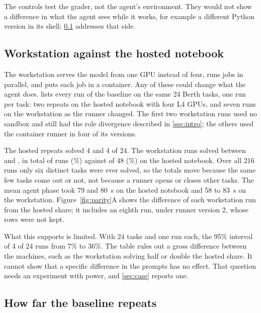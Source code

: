 The controls test the grader, not the agent's environment. They would not show a difference in what the agent sees
while it works, for example a different Python version in its shell; \cref{sec:parity} addresses that side.

\subsection{Workstation against the hosted notebook}\label{sec:parity}



The workstation serves the model from one GPU instead of four, runs jobs in parallel, and puts each job in a
container. Any of these could change what the agent does.  lists every run of the baseline on the
same 24 Berth tasks, one run per task: two repeats on the hosted notebook with four L4 GPUs, and seven runs on the
workstation as the runner changed. The first two workstation runs used no sandbox and still had the role divergence
described in \cref{sec:intro}; the others used the container runner in four of its versions.

The hosted repeats solved 4 and 4 of 24. The workstation runs solved between \ParityMin{} and \ParityMax{}, in total
\ParityWsTotal{} of \ParityWsRuns{} runs (\ParityWsPct\%) against \ParityHostedTotal{} of 48 (\ParityHostedPct\%) on
the hosted notebook. Over all 216 runs only six distinct tasks were ever solved, so the totals move because the same
few tasks come out or not, not because a runner opens or closes other tasks. The mean agent phase took 79 and 80~s on
the hosted notebook and 58 to 83~s on the workstation. Figure~\ref{fig:parity}A shows the difference of each
workstation run from the hosted share; it includes an eighth run, under runner version 2, whose rows were not kept.

What this supports is limited. With 24 tasks and one run each, the 95\% interval of 4 of 24 runs from 7\% to 36\%.
The table rules out a gross difference between the machines, such as the workstation solving half or double the
hosted share. It cannot show that a specific difference in the prompts has no effect. That question needs an
experiment with power, and \cref{sec:case} reports one.

\subsection{How far the baseline repeats}


